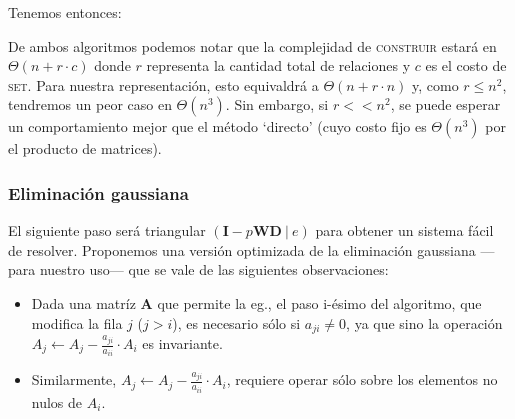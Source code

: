 \pagebreak
\noindent Tenemos entonces:
\vspace{1em}


\vspace{1em}


\vspace{1em}

De ambos algoritmos podemos notar que la complejidad de \textsc{construir} estará en $\Theta(n + r \cdot c)$ donde $r$ representa la cantidad total de relaciones y $c$ es el costo de \textsc{set}. Para nuestra representación, esto equivaldrá a $\Theta(n + r \cdot n)$ y, como $r \leq n^2$, tendremos un peor caso en $\Theta(n^3)$. Sin embargo, si $r << n^2$, se puede esperar un comportamiento mejor que el método `directo' (cuyo costo fijo es $\Theta(n^3)$ por el producto de matrices).     

    
\vspace{3em}
\subsubsection{Eliminación gaussiana} El siguiente paso será triangular $(\mathbf{I} - p\mathbf{W}\mathbf{D} \ |\ e)$ para obtener un sistema fácil de resolver. Proponemos una versión optimizada de la eliminación gaussiana ---para nuestro uso--- que se vale de las siguientes observaciones: 

\vspace{1em}
\begin{itemize}
    \item Dada una matríz $\mathbf{A}$ que permite la eg., el paso i-ésimo del algoritmo, que modifica la fila $j$ ($j > i$), es necesario sólo si $a_{ji} \neq 0$, ya que sino la operación $A_j \leftarrow A_j - \frac{a_{ji}}{a_{ii}}\cdot A_i$ es invariante. 
    \item Similarmente, $A_j \leftarrow A_j - \frac{a_{ji}}{a_{ii}}\cdot A_i$, requiere operar sólo sobre los elementos no nulos de $A_i$.
\end{itemize}
\vspace{1em}


\vspace{1em}

